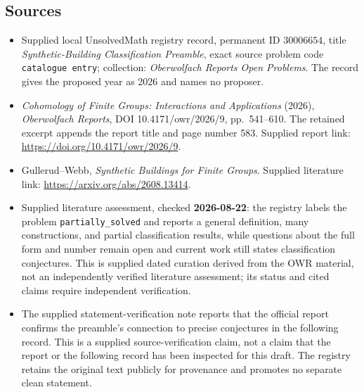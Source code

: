 \documentclass[11pt]{article}
\begin{document}
\subsection{Sources}
\begin{itemize}
\item Supplied local UnsolvedMath registry record, permanent ID \(30006654\), title \emph{Synthetic-Building Classification Preamble}, exact source problem code \texttt{catalogue entry}; collection: \emph{Oberwolfach Reports Open Problems}. The record gives the proposed year as 2026 and names no proposer.
\item \emph{Cohomology of Finite Groups: Interactions and Applications} (2026), \emph{Oberwolfach Reports}, DOI 10.4171/owr/2026/9, pp.\ 541--610. The retained excerpt appends the report title and page number 583. Supplied report link: \url{https://doi.org/10.4171/owr/2026/9}.
\item Gullerud--Webb, \emph{Synthetic Buildings for Finite Groups}. Supplied literature link: \url{https://arxiv.org/abs/2608.13414}.
\item Supplied literature assessment, checked \textbf{2026-08-22}: the registry labels the problem \texttt{partially\_solved} and reports a general definition, many constructions, and partial classification results, while questions about the full form and number remain open and current work still states classification conjectures. This is supplied dated curation derived from the OWR material, not an independently verified literature assessment; its status and cited claims require independent verification.
\item The supplied statement-verification note reports that the official report confirms the preamble's connection to precise conjectures in the following record. This is a supplied source-verification claim, not a claim that the report or the following record has been inspected for this draft. The registry retains the original text publicly for provenance and promotes no separate clean statement.
\end{itemize}
\end{document}
